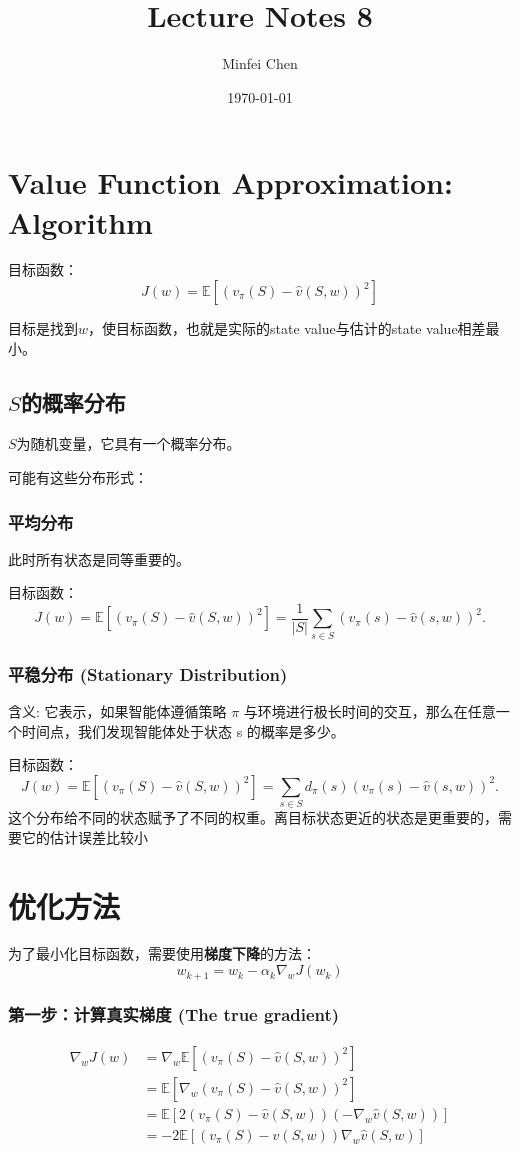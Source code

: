 \documentclass{article}
\begin{document}
\title{Lecture Notes 8}
\author{Minfei Chen}
\date{\today}
\maketitle
\section{Value Function Approximation: Algorithm}
目标函数：
$$
J(w) = \mathbb{E} \left[ (v_{\pi}(S) - \hat{v}(S, w))^2 \right]
$$

目标是找到$w$，使目标函数，也就是实际的state value与估计的state value相差最小。
\subsection{$S$的概率分布}
$S$为随机变量，它具有一个概率分布。

可能有这些分布形式：
\subsubsection{平均分布}
此时所有状态是同等重要的。

目标函数：
$$
J(w) = \mathbb{E} \left[ (v_{\pi}(S) - \hat{v}(S, w))^2 \right] = \frac{1}{|S|} \sum_{s \in S} (v_{\pi}(s) - \hat{v}(s, w))^2.
$$
\subsubsection{平稳分布 (Stationary Distribution)}
含义: 它表示，如果智能体遵循策略 $\pi$ 与环境进行极长时间的交互，那么在任意一个时间点，我们发现智能体处于状态 s 的概率是多少。

目标函数：
$$
J(w) = \mathbb{E}\left[ (v_{\pi}(S) - \hat{v}(S, w))^2 \right] = \sum_{s \in S} d_{\pi}(s) (v_{\pi}(s) - \hat{v}(s, w))^2.
$$
这个分布给不同的状态赋予了不同的权重。离目标状态更近的状态是更重要的，需要它的估计误差比较小
\section{优化方法}
为了最小化目标函数，需要使用\textbf{梯度下降}的方法：
$$
w_{k+1} = w_k - \alpha_k \nabla_w J(w_k)
$$
\subsubsection*{第一步：计算真实梯度 (The true gradient)}
\begin{align*}
    \nabla_w J(w) &= \nabla_w \mathbb{E}\left[(v_{\pi}(S) - \hat{v}(S, w))^2\right] \\
    &= \mathbb{E}\left[\nabla_w(v_{\pi}(S) - \hat{v}(S, w))^2\right] \\
    &= \mathbb{E}\left[2(v_{\pi}(S) - \hat{v}(S, w))(-\nabla_w \hat{v}(S, w))\right] \\
    &= -2\mathbb{E}\left[(v_{\pi}(S) - \hat{v}(S, w))\nabla_w \hat{v}(S, w)\right]
\end{align*}
\end{document}
